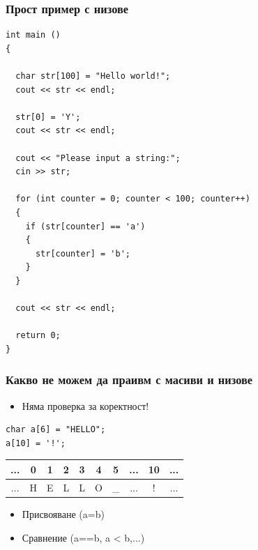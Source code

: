 \documentclass{beamer}
\begin{document}
\begin{frame}[fragile]
\frametitle{Прост пример с низове}

\begin{flushleft}
\begin{lstlisting}
int main ()
{

  char str[100] = "Hello world!";
  cout << str << endl;

  str[0] = 'Y';
  cout << str << endl;

  cout << "Please input a string:";
  cin >> str;

  for (int counter = 0; counter < 100; counter++)
  {
    if (str[counter] == 'a')
    {
      str[counter] = 'b';
    }
  }

  cout << str << endl;

  return 0;
}
\end{lstlisting}
\end{flushleft}

\end{frame}


\begin{frame}[fragile]
\frametitle{Какво не можем да праивм с масиви и низове}

\begin{itemize}
  \item Няма проверка за коректност!
\end{itemize}

\begin{flushleft}
\begin{lstlisting}
char a[6] = "HELLO";
a[10] = '!';
\end{lstlisting}


\begin{tabular}{c | c | c | c | c | c | c | c | c | c}
\hline
...&0 &1 &2 &3 &4 &5   &...&10&... \\\hline
...&H &E &L &L &O & \_ &...&\alert{!}& ... \\\hline
\end{tabular}
\end{flushleft}

\pause

\begin{itemize}
  \item Присвояване (a=b)
  \pause
  \item Сравнение (a==b, a < b,...)
\end{itemize}

\end{frame}
\end{document}
